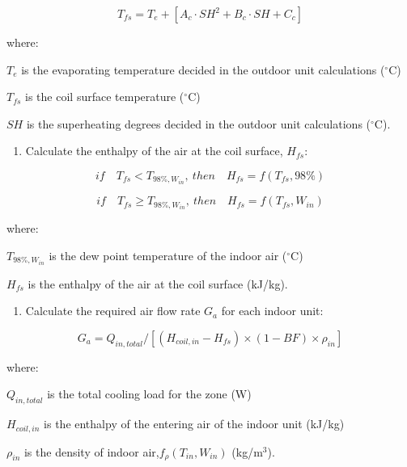 \begin{equation}
T_{fs} = T_e+[A_c\cdot SH^2+B_c\cdot SH+C_c]
\end{equation}

where:

\(T_e\) is the evaporating temperature decided in the outdoor unit calculations (\(^{\circ}\)C)

\(T_{fs}\) is the coil surface temperature (\(^{\circ}\)C)

\(SH\) is the superheating degrees decided in the outdoor unit calculations (\(^{\circ}\)C).

\begin{enumerate}
\def\labelenumi{\arabic{enumi})}
\setcounter{enumi}{1}
\tightlist
\item
  Calculate the enthalpy of the air at the coil surface, \(H_{fs}\):
\end{enumerate}

\begin{equation}
if\quad{T_{fs}}<T_{98\%,W_{in}}{, ~then}\quad{H_{fs}} = f(T_{fs},98\%)
\end{equation}

\begin{equation}
if\quad{T_{fs}}\ge{T_{98\%,W_{in}}}{,~then}\quad{H_{fs}} = f(T_{fs},W_{in})
\end{equation}

where:

\(T_{98\%,W_{in}}\) is the dew point temperature of the indoor air (\(^{\circ}\)C)

\(H_{fs}\) is the enthalpy of the air at the coil surface (kJ/kg).

\begin{enumerate}
\def\labelenumi{\arabic{enumi})}
\setcounter{enumi}{2}
\tightlist
\item
  Calculate the required air flow rate \(G_a\) for each indoor unit:
\end{enumerate}

\begin{equation}
G_a = Q_{in,total}/[(H_{coil,in}-H_{fs})\times{(1-BF)}\times{\rho_{in}}]
\end{equation}

where:

\(Q_{in,total}\) is the total cooling load for the zone (W)

\(H_{coil,in}\) is the enthalpy of the entering air of the indoor unit (kJ/kg)

\(\rho_{in}\) is the density of indoor air,\(f_{\rho}(T_{in},W_{in})\) (kg/m\(^{3}\)).

